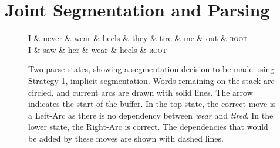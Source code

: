\documentclass[11pt,letterpaper]{article}
\begin{document}
\section{Joint Segmentation and Parsing}

%

\begin{figure}
\begin{dependency}[theme=simple, edge unit distance=1.0ex]
    \begin{deptext}[row sep=2.0ex]
        I \& never \& wear \& heels \& they \& tire \& me \& out \& \textsc{root} \\
        I \& saw \& her \& wear \& heels \& \textsc{root} \\
    \end{deptext}




    \end{dependency}
    \vspace*{-2em}
\caption{\small Two parse states, showing a segmentation decision to be made using
    Strategy 1, implicit segmentation.
    Words remaining on the stack are
    circled, and current arcs are drawn with solid lines.  The arrow indicates
    the start of the buffer.  In the top state, the correct move is a Left-Arc
    as there is no dependency between \emph{wear} and \emph{tired}.  In the
    lower state, the Right-Arc is correct.  The  dependencies that would be
added by these moves are shown with dashed lines.\label{fig:left_state}}
\end{figure}
\end{document}
